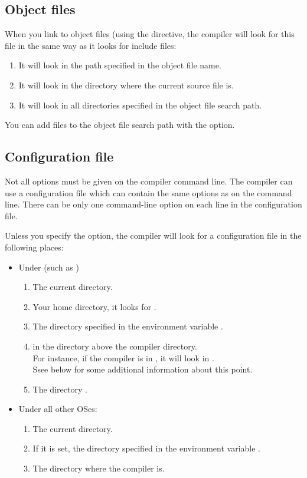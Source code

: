 \subsection{Object files}
When you link to object files (using the  directive,
the compiler will look for this file in the same way as it looks for include
files:

\begin{enumerate}
\item It will look in the path specified in the object file name.
\item It will look in the directory where the current source file is.
\item It will look in all directories specified in the object file search path.
\end{enumerate}
You can add files to the object file search path with the  option.

\subsection{Configuration file}
\label{searchconfig}

Not all options must be given on the compiler command line. The compiler
can use a configuration file which can contain the same options as on the
command line. There can be only one command-line option on each line in 
the configuration file.

Unless you specify the  option, the compiler will look
for a configuration file  in the following places:

\begin{itemize}
\item Under \unix (such as \linux)
\begin{enumerate}
\item The current directory.
\item Your home directory, it looks for .
\item The directory specified in the environment 
variable .
\item in the  directory above the compiler directory.\\
For instance, if the compiler is in , it will look in
. \\
Ssee below for some additional information about this point.

\item The directory .
\end{enumerate}
\item Under all other OSes:
\begin{enumerate}
\item The current directory.
\item If it is set, the directory specified in the environment variable
.
\item The directory where the compiler is.
\end{enumerate}
\end{itemize}

